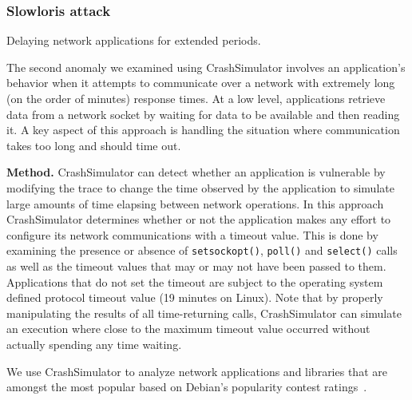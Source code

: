 \subsubsection{Slowloris attack} Delaying network applications for extended
periods.




The second anomaly we examined using CrashSimulator
involves an application's behavior when it attempts to communicate over a network
with extremely long (on the order of minutes) response times.  At a low level,
applications retrieve data from a network socket by waiting for data to be
available and then reading it.  A key aspect of this approach is handling the 
situation where communication takes too long and should time out.

{\bf Method.}
CrashSimulator can detect whether an application is vulnerable by modifying
the trace to change the time observed by the application to simulate large
amounts of time elapsing between network operations.
In this approach CrashSimulator determines
whether or not the application makes any effort to configure its network
communications with a timeout value. This is done by examining the presence or
absence of {\tt setsockopt()}, {\tt poll()} and {\tt select()} calls as well as
the timeout values that may or may not have been passed to them. Applications
that do not set the timeout are subject to the operating
system defined protocol timeout value (19 minutes on Linux).
Note that by properly manipulating the results of all
time-returning calls, CrashSimulator can simulate an execution where close to
the maximum timeout value occurred without actually spending any time
waiting.


We use CrashSimulator to analyze  network applications and libraries
that are amongst the most popular based on Debian's popularity contest 
ratings~\cite{DebPopCon}. 

